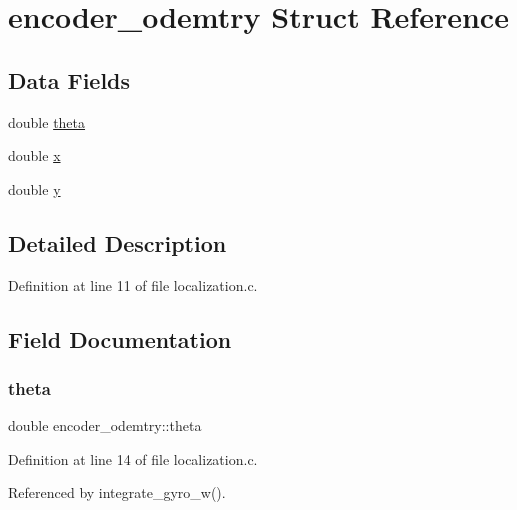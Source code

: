 \hypertarget{structencoder__odemtry}{}\section{encoder\+\_\+odemtry Struct Reference}
\label{structencoder__odemtry}
\subsection*{Data Fields}
\begin{DoxyCompactItemize}
\item 
double \hyperlink{structencoder__odemtry_af1a1e2a2a7a2f89138a8c261a3b82898}{theta}
\item 
double \hyperlink{structencoder__odemtry_a9a803978381f9b89a031d520a627cbcf}{x}
\item 
double \hyperlink{structencoder__odemtry_a955cbea800158b8c0cd5f36b253fe6bb}{y}
\end{DoxyCompactItemize}


\subsection{Detailed Description}


Definition at line 11 of file localization.\+c.



\subsection{Field Documentation}
\mbox{\label{structencoder__odemtry_af1a1e2a2a7a2f89138a8c261a3b82898}} 
\subsubsection{\texorpdfstring{theta}{theta}}
{\footnotesize\ttfamily double encoder\+\_\+odemtry\+::theta}



Definition at line 14 of file localization.\+c.



Referenced by integrate\+\_\+gyro\+\_\+w().

\mbox{\label{structencoder__odemtry_a9a803978381f9b89a031d520a627cbcf}} 
